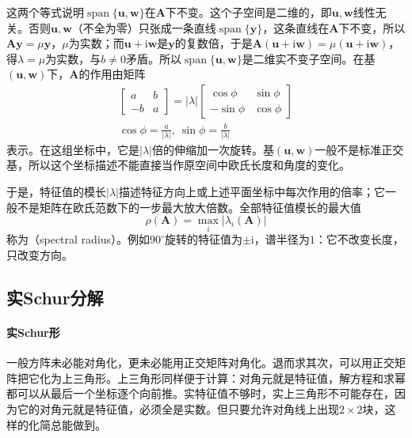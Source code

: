 这两个等式说明$\operatorname{span}\{\bm u,\bm w\}$在$\bm A$下不变。这个子空间是二维的，即$\bm u,\bm w$线性无关。否则$\bm u,\bm w$（不全为零）只张成一条直线$\operatorname{span}\{\bm y\}$，这条直线在$\bm A$下不变，所以$\bm A\bm y=\mu\bm y$，$\mu$为实数；而$\bm u+\mathrm i\bm w$是$\bm y$的复数倍，于是$\bm A(\bm u+\mathrm i\bm w)=\mu(\bm u+\mathrm i\bm w)$，得$\lambda=\mu$为实数，与$b\neq0$矛盾。所以$\operatorname{span}\{\bm u,\bm w\}$是二维实不变子空间。在基$(\bm u,\bm w)$下，$\bm A$的作用由矩阵
\[
\begin{gathered}
\begin{bmatrix}a&b\\-b&a\end{bmatrix}
 =|\lambda|\begin{bmatrix}\cos\phi&\sin\phi\\-\sin\phi&\cos\phi\end{bmatrix}\\
\cos\phi=\frac{a}{|\lambda|},\ \sin\phi=\frac{b}{|\lambda|}
\end{gathered}
\]
表示。在这组坐标中，它是$|\lambda|$倍的伸缩加一次旋转。基$(\bm u,\bm w)$一般不是标准正交基，所以这个坐标描述不能直接当作原空间中欧氏长度和角度的变化。

于是，特征值的模长$|\lambda|$描述特征方向上或上述平面坐标中每次作用的倍率；它一般不是矩阵在欧氏范数下的一步最大放大倍数。全部特征值模长的最大值
\[
 \rho(\bm A)=\max_i|\lambda_i(\bm A)|
\]
称为（spectral radius）。例如$90^\circ$旋转的特征值为$\pm\mathrm i$，谱半径为$1$：它不改变长度，只改变方向。

\subsection{实Schur分解}

\paragraph{实Schur形}

一般方阵未必能对角化，更未必能用正交矩阵对角化。退而求其次，可以用正交矩阵把它化为上三角形。上三角形同样便于计算：对角元就是特征值，解方程和求幂都可以从最后一个坐标逐个向前推。实特征值不够时，实上三角形不可能存在，因为它的对角元就是特征值，必须全是实数。但只要允许对角线上出现$2\times2$块，这样的化简总能做到。

